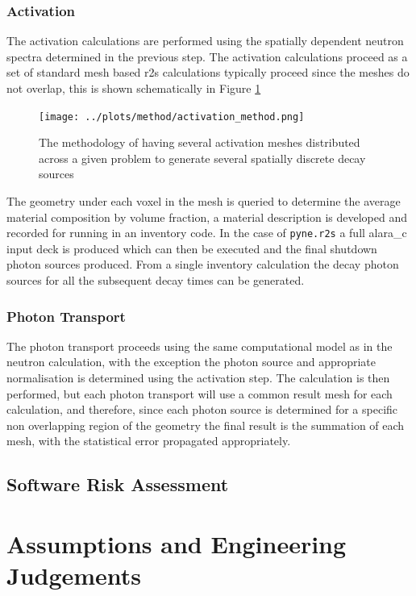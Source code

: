 \documentclass[12pt]{article}
\begin{document}
\subsubsection{Activation}
The activation calculations are performed using the spatially dependent neutron
spectra determined in the previous step. The activation calculations proceed as
a set of standard mesh based \gls{r2s} calculations typically proceed since the 
meshes do not overlap, this is shown schematically in Figure
\ref{fig:activation_method}
\begin{figure}[ht!]
  \centering
  \texttt{[image: ../plots/method/activation\_method.png]}
  \caption{The methodology of having several activation meshes distributed
           across a given problem to generate several spatially discrete
           decay sources}
  \label{fig:activation_method}
\end{figure}
The geometry under each voxel in the mesh is queried to 
determine the average material composition by volume fraction, a material 
description is developed and recorded for running in an inventory code. In the 
case of \texttt{pyne.r2s} a full \gls{alara_c} input deck is produced which can
then be executed and the final shutdown photon sources produced. From a single
inventory calculation the decay photon sources for all the subsequent decay
times can be generated.  
\subsubsection{Photon Transport}
The photon transport proceeds using the same computational model as in the 
neutron calculation, with the exception the photon source and appropriate 
normalisation is determined using the activation step. The calculation is then
performed, but each photon transport will use a common result mesh for each 
calculation, and therefore, since each photon source is determined for a 
specific non overlapping region of the geometry the final result is the 
summation of each mesh, with the statistical error propagated appropriately.
\subsection{Software Risk Assessment}
\clearpage
\newpage
\section{Assumptions and Engineering Judgements}
\end{document}
